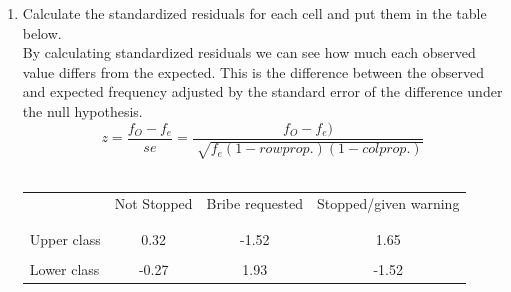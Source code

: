 \documentclass[12pt,letterpaper]{article}
\begin{document}
\begin{enumerate}
	\vspace*{1cm}
	\item [(c)] Calculate the standardized residuals for each cell and put them in the table below. \\

	By calculating standardized residuals we can see how much each observed value differs from the expected. 
	This is the difference between the observed and expected frequency adjusted by the standard error of the difference under the null hypothesis. \\
	
	\begin{equation}
		z = \frac{f_O - f_e}{se} =
		 \frac{f_O - f_e)}{\sqrt[]{f_e(1-row prop.)(1- col prop.)}}
	\end{equation}\\
	
	
	
	\begin{table}[h]
		\centering
		\begin{tabular}{l | c c c }
			& Not Stopped & Bribe requested & Stopped/given warning \\
			\\[-1.8ex] 
			\hline \\[-1.8ex]
			Upper class  & 0.32 & -1.52 & 1.65 \\
			\\
			Lower class & -0.27  &  1.93 & -1.52  \\
			                                              
		\end{tabular}
	\end{table}
	
	
	

\end{enumerate}
\end{document}
